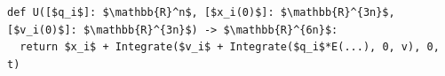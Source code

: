 \documentclass[border=10pt]{standalone}
\begin{document}
\begin{lstlisting}
def U([$q_i$]: $\mathbb{R}^n$, [$x_i(0)$]: $\mathbb{R}^{3n}$, [$v_i(0)$]: $\mathbb{R}^{3n}$) -> $\mathbb{R}^{6n}$:
  return $x_i$ + Integrate($v_i$ + Integrate($q_i$*E(...), 0, v), 0, t)
\end{lstlisting}
\end{document}

